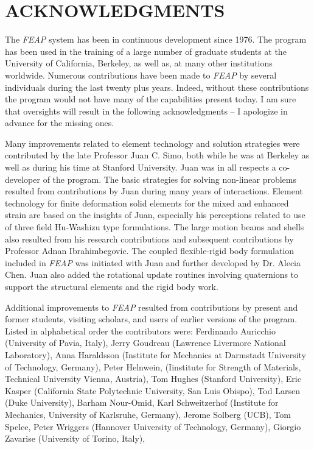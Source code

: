 \chapter[Acknowledgments]{ACKNOWLEDGMENTS}
\label{ackn}

The {\sl FEAP} system has been in continuous development since 1976.  The
program has been used in the training of a large number of graduate students at
the University of California, Berkeley, as well as, at many other 
institutions worldwide.  Numerous contributions have been made to {\sl FEAP}
by several individuals during the last twenty plus years.  Indeed, without these
contributions the program would not have many of the capabilities present today.  
I am sure that oversights will result in the following acknowledgments --
I apologize in advance for the missing ones.

Many improvements
related to element technology and solution strategies were contributed by
the late Professor Juan C. Simo, both while he was at Berkeley as well as
during his time at Stanford University.
Juan was in all respects a co-developer of the program.
The basic strategies for solving
non-linear problems resulted from contributions by Juan during many
years of interactions.  Element technology for finite deformation solid
elements for the mixed and enhanced strain are based on the insights of Juan,
especially his perceptions related to use of three field Hu-Washizu
type formulations.  The large motion beams and shells also resulted
from his research contributions and subsequent contributions by Professor
Adnan Ibrahimbegovic.  The coupled flexible-rigid
body formulation included in {\sl FEAP} was initiated with Juan and further
developed by Dr. Alecia Chen.
Juan also added the rotational update routines involving quaternions
to support the structural elements and the rigid body work.

Additional improvements to {\sl FEAP} resulted from 
contributions by present and former students, visiting scholars,
and users of earlier
versions of the program.  Listed in alphabetical order the contributors were:
Ferdinando Auricchio (University of Pavia, Italy),
Jerry Goudreau (Lawrence Livermore National Laboratory),
Anna Haraldsson (Institute for Mechanics at Darmstadt University of
Technology, Germany),
Peter Helnwein, (Iinstitute for Strength of Materials, Technical University
Vienna, Austria),
Tom Hughes (Stanford University),
Eric Kasper (California State Polytechnic University, San Luis Obispo),
Tod Larsen (Duke University),
Barham Nour-Omid,
Karl Schweitzerhof (Institute for Mechanics, University of Karlsruhe, Germany),
Jerome Solberg (UCB),
Tom Spelce,
Peter Wriggers (Hannover University of Technology, Germany),
Giorgio Zavarise (University of Torino, Italy),

